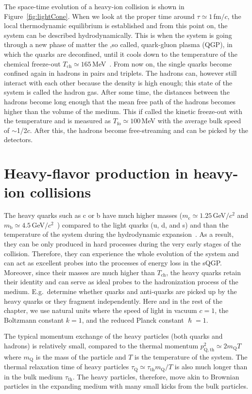 The space-time evolution of a heavy-ion collision is shown in Figure~\ref{fig:lightCone}. When we look at the proper time around $\tau \simeq 1\,$fm$/c$, the local thermodynamic equilibrium is established and from this point on, the system can be described hydrodynamically. This is when the system is going through a new phase of matter the ,so called, quark-gluon plasma (QGP), in which the quarks are deconfined, until it cools down to the temperature of the chemical freeze-out $T_\mathrm{ch} \simeq 165\,$MeV~\cite{ALICE_lightFlavor,STAR_LightFlavor}\@. From now on, the single quarks become confined again in hadrons in pairs and triplets. The hadrons can, however still interact with each other because the density is high enough; this state of the system is called the hadron gas. After some time, the distances between the hadrons become long enough that the mean free path of the hadrons becomes higher than the volume of the medium. This if called the kinetic freeze-out with the temperature and is measured as $T_\mathrm{fo} \simeq 100\,$MeV with the average bulk speed of $\sim$1/2$c$\@. After this, the hadrons become free-streaming and can be picked by the detectors.


\section{Heavy-flavor production in heavy-ion collisions}

The heavy quarks such as c or b have much higher masses ($m_\mathrm{c} \simeq 1.25\,$GeV$/c^2$ and $m_\mathrm{b} \simeq 4.5\,$GeV$/c^2$~\cite{PDG}) compared to the light quarks (u, d, and s) and  than the temperature of the system during the hydrodynamic expansion~\cite{summaryHF,Prino_Rapp_HF}. As a result, they can be only produced in hard processes during the very early stages of the collision. Therefore, they can experience the whole evolution of the system and can act as excellent probes into the processes of energy loss in the sQGP\@. Moreover, since their masses are much higher than $T_\mathrm{ch}$, the heavy quarks retain their identity and can serve as ideal probes to the hadronization process of the medium. E.g.\ determine whether quarks and anti-quarks are picked up by the heavy quarks or they fragment independently. Here and in the rest of the chapter, we use natural units where the speed of light in vacuum $c = 1$, the Boltzmann constant $k = 1$, and the reduced Planck constant $\hslash = 1$\@.

The typical momentum exchange of the heavy particles (both quarks and hadrons) is relatively small, compared to the thermal momentum $p^2_\mathrm{Q,th} \simeq 2m_\mathrm{Q}T$~\cite{Prino_Rapp_HF} where $m_\mathrm{Q}$ is the mass of the particle and $T$ is the temperature of the system\@. The thermal relaxation 
time of heavy particles  $\tau_\mathrm{Q} \simeq \tau_\mathrm{th}m_\mathrm{Q}/T$ is also much longer than in the bulk medium $\tau_\mathrm{th}$\@. The heavy particles, therefore, move akin to Brownian particles in the expanding medium with many small kicks from the bulk particles.


